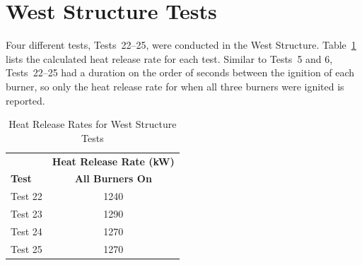 \documentclass[12pt,oneside]{book}
\begin{document}
\section{West Structure Tests}
\label{sec:west_procedure}
Four different tests, Tests~22--25, were conducted in the West Structure. Table~\ref{table:HRR_West} lists the calculated heat release rate for each test. Similar to Tests~5 and 6, Tests~22--25 had a duration on the order of seconds between the ignition of each burner, so only the heat release rate for when all three burners were ignited is reported.   

\begin{table}[!ht]
\caption{Heat Release Rates for West Structure Tests}
\begin{tabular}{lc}
 \toprule
					& 	\textbf{Heat Release Rate (kW)}	\\
\textbf{Test}		& \textbf{All Burners On} \\
 \midrule
Test 22				&     	1240 	  \\
Test 23				&     	1290 	  \\
Test 24				& 	    1270 	  \\
Test 25				&     	1270 	  \\
\bottomrule
\end{tabular}
\label{table:HRR_West}
\end{table}
\end{document}
